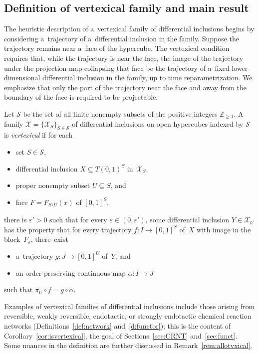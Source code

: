 \subsection{Definition of vertexical family and main result}
\label{sub:main}

The heuristic description of a~vertexical family of dif\/ferential inclusions begins by considering a~trajectory of
a~dif\/ferential inclusion in the family.
Suppose the trajectory remains near a~face of the hypercube.
The vertexical condition requires that, while the trajectory is near the face, the image of the trajectory under the
projection map collapsing that face be the trajectory of a~f\/ixed lower-dimensional dif\/ferential inclusion in the
family, up to time reparametrization.
We emphasize that only the part of the trajectory near the face and away from the boundary of the face is required to
be projectable.
\begin{Definition}\label{d:vertexical}
Let $\mathcal S$ be the set of all f\/inite nonempty subsets of the positive integers $\mathbb{Z}_{\geq1}$.
A family $\mathcal X=\{\mathcal X_S\}_{S\in\mathcal S}$ of dif\/ferential inclusions on open hypercubes indexed by
$\mathcal S$ is \emph{vertexical} if for each
\begin{itemize}\itemsep=-0.5pt
\item set $S\in\mathcal S$, \item dif\/ferential inclusion $X\subseteq T(0,1)^S$ in~$\mathcal X_S$, \item proper
nonempty subset $U\subseteq S$, and \item face $F=F_{S\setminus U}(x)$ of $[0,1]^S$,
\end{itemize}
there is $\varepsilon'>0$ such that for every $\varepsilon\in(0,\varepsilon')$, some dif\/ferential inclusion
$Y\in\mathcal X_U$ has the property that for every trajectory $f:I\to[0,1]^S$ of~$X$ with image in the
block~$F_\varepsilon$, there~exist
\begin{itemize}\itemsep=0pt
\item a~trajectory $g:J\to[0,1]^U$ of~$Y$, and \item an order-preserving continuous map $\alpha:I\to J$
\end{itemize}
such that $\pi_U\circ f=g\circ\alpha$.
\end{Definition}

Examples of vertexical families of dif\/ferential inclusions include those arising from reversible, weakly reversible,
endotactic, or strongly endotactic chemical reaction networks  (Def\/initions~\ref{def:network} and~\ref{d:functor});
this is the content of Corollary~\ref{cor:isvertexical}, the goal of Sections~\ref{sec:CRNT} and~\ref{sec:funct}.
Some nuances in the def\/inition are further discussed in Remark~\ref{rem:allotvxical}.

